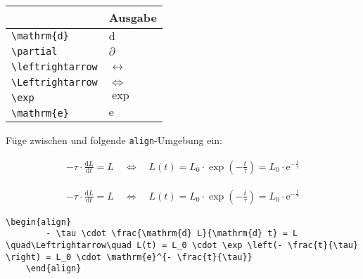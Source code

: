 \documentclass["WS\space 16-17\space -\space LaTeX-Kurs\space -\space Praesentation\space -\space 1.tex"]{subfiles}
\begin{document}
\begin{frame}[fragile]
	\begin{center}
		\begin{tabular}{ll}
			\toprule
			\color{math-cmd}{Mathe}\color{black}{-Befehl}							&	Ausgabe					\\ \midrule
			\lstinline|\mathrm{d}|		&	$\mathrm{d}$		\\
			\lstinline|\partial|		&	$\partial$		
			\\
			\lstinline|\leftrightarrow|		&	$\leftrightarrow$		
      \\
			\lstinline|\Leftrightarrow|		&	$\Leftrightarrow$		
			\\
			\lstinline|\exp|					&	$\exp$		\\
      \lstinline|\mathrm{e}|		& $\mathrm{e}$		\\
			\bottomrule
		\end{tabular}
	\end{center}
	\pause\btVFill
	\Aufgabee
	Füge zwischen \qquote{$\tau$} und  folgende \lstinline[basicstyle=\normalfont\normalsize]|align|-Umgebung ein:
	\begin{outputbox}
	    \begin{align}
	      - \tau \cdot \frac{\mathrm{d} L}{\mathrm{d} t} = L \quad\Leftrightarrow\quad L(t) = L_0 \cdot \exp \left(- \frac{t}{\tau} \right) = L_0 \cdot \mathrm{e}^{- \frac{t}{\tau}}
	    \end{align}	
    \end{outputbox}
	\vspace{0.3cm}
\end{frame}
\begin{frame}[fragile]
	\Losung
	\begin{outputbox}
	    \begin{align}
	        - \tau \cdot \frac{\mathrm{d} L}{\mathrm{d} t} = L \quad\Leftrightarrow\quad L(t) = L_0 \cdot \exp \left(- \frac{t}{\tau} \right) = L_0 \cdot \mathrm{e}^{- \frac{t}{\tau}}
	    \end{align}
	\end{outputbox}

	\Code
	\begin{lstlisting}[gobble=4]
    \begin{align}
        - \tau \cdot \frac{\mathrm{d} L}{\mathrm{d} t} = L \quad\Leftrightarrow\quad L(t) = L_0 \cdot \exp \left(- \frac{t}{\tau} \right) = L_0 \cdot \mathrm{e}^{- \frac{t}{\tau}}
    \end{align}
	\end{lstlisting}
\end{frame}
\end{document}
